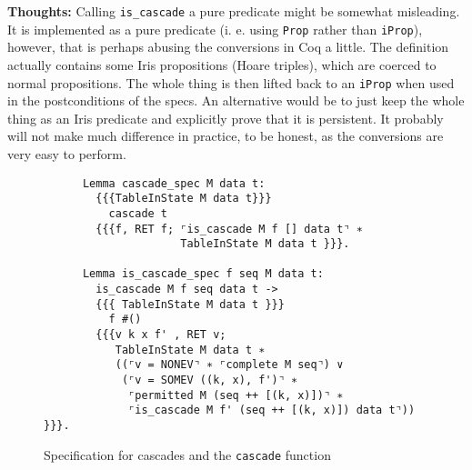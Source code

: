 \documentclass[10pt,a4paper]{article}
\renewcommand{\fcolorbox}[4][]{#4}}
\newcommand{\thoughts}[1]{\noindent\fcolorbox{black}{cyan}{\parbox{\textwidth}{\textbf{Thoughts:} \linebreak #1}}}
\begin{document}
\thoughts{Calling \texttt{is\_cascade} a pure predicate might be somewhat misleading. It is implemented as a pure predicate (i. e. using \texttt{Prop} rather than \texttt{iProp}), however, that is perhaps abusing the conversions in Coq a little. The definition actually contains some Iris propositions (Hoare triples), which are coerced to normal propositions. The whole thing is then lifted back to an \texttt{iProp} when used in the postconditions of the specs. An alternative would be to just keep the whole thing as an Iris predicate and explicitly prove that it is persistent. It probably will not make much difference in practice, to be honest, as the conversions are very easy to perform.}

\begin{figure}
\begin{verbatim}
      Lemma cascade_spec M data t:
        {{{TableInState M data t}}}
          cascade t
        {{{f, RET f; ⌜is_cascade M f [] data t⌝ ∗
                     TableInState M data t }}}.

      Lemma is_cascade_spec f seq M data t:
        is_cascade M f seq data t ->
        {{{ TableInState M data t }}}
          f #()
        {{{v k x f' , RET v;
           TableInState M data t ∗
           ((⌜v = NONEV⌝ ∗ ⌜complete M seq⌝) ∨
            (⌜v = SOMEV ((k, x), f')⌝ ∗
             ⌜permitted M (seq ++ [(k, x)])⌝ ∗           
             ⌜is_cascade M f' (seq ++ [(k, x)]) data t⌝)) }}}.
\end{verbatim}
\caption{Specification for cascades and the \texttt{cascade} function}
\label{fig:cascade_spec}
\end{figure}
\end{document}
